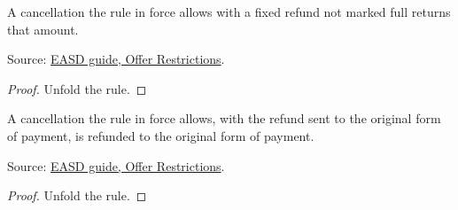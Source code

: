 \begin{theorem}
  \label{thm:offers-cancel-fixed}
  A cancellation the rule in force allows with a fixed refund not marked
  full returns that amount.

  Source: \href{https://standards.atlassian.net/wiki/spaces/EASD/pages/574259692/Offer+Restrictions}{EASD guide, Offer Restrictions}.
\end{theorem}
\begin{proof}
  Unfold the rule.
\end{proof}

\begin{theorem}
  \label{thm:offers-cancel-original-form}
  A cancellation the rule in force allows, with the refund sent to the
  original form of payment, is refunded to the original form of payment.

  Source: \href{https://standards.atlassian.net/wiki/spaces/EASD/pages/574259692/Offer+Restrictions}{EASD guide, Offer Restrictions}.
\end{theorem}
\begin{proof}
  Unfold the rule.
\end{proof}

